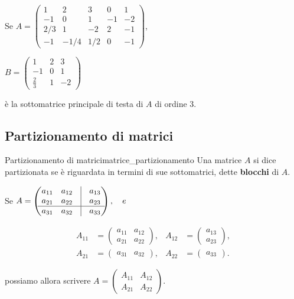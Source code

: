 \documentclass[12pt]{report}
\newcounter{definition}
\newcommand{\nmu}{}
\begin{document}
\begin{example}{}{}
Se $A = \begin{pmatrix}
1 & 2 & 3 & 0 & 1 \\
-1 & 0 & 1 & -1 & -2 \\
2/3 & 1 & -2 & 2 & -1 \\
-1 & -1/4 & 1/2 & 0 & -1
\end{pmatrix}$,

$B = \begin{pmatrix}
1 & 2 & 3 \\
-1 & 0 & 1 \\
\frac{2}{3} & 1 & -2
\end{pmatrix}$


è la sottomatrice principale di testa di $A$ di ordine 3.
\end{example}
\subsection{Partizionamento di matrici}
\begin{definition}{\nmu Partizionamento di matrici}{matrice_partizionamento}
	Una matrice $A$ si dice partizionata se è riguardata in termini di sue sottomatrici, dette \textbf{blocchi} di $A$.
\end{definition}
\begin{example}{}{}
Se $A = \begin{pmatrix}
a_{11} & a_{12} & \vline & a_{13} \\
a_{21} & a_{22} & \vline & a_{23} \\
\hline
a_{31} & a_{32} & \vline & a_{33}
\end{pmatrix}, \quad e$

\begin{align*}
A_{11} &= \begin{pmatrix} a_{11} & a_{12} \\ a_{21} & a_{22} \end{pmatrix}, &
A_{12} &= \begin{pmatrix} a_{13} \\ a_{23} \end{pmatrix}, \\
A_{21} &= \begin{pmatrix} a_{31} & a_{32} \end{pmatrix}, &
A_{22} &= \begin{pmatrix} a_{33} \end{pmatrix}.
\end{align*}

possiamo allora scrivere $A = \begin{pmatrix} A_{11} & A_{12} \\ A_{21} & A_{22} \end{pmatrix}.$
\end{example}
\end{document}
